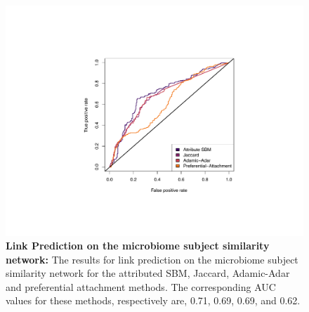 \begin{figure}
\begin{center}
\includegraphics[width=1\textwidth]{ROC_Microbiome.pdf}
\caption{{\bf Link Prediction on the microbiome subject similarity network:} The results for link prediction on the microbiome subject similarity network for the attributed SBM, Jaccard, Adamic-Adar and preferential attachment methods. The corresponding AUC values for these methods, respectively are, 0.71, 0.69, 0.69, and 0.62.}
\label{Fig5}
\end{center}
\end{figure}

